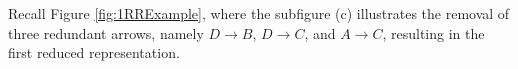 
\vspace{-2mm}
\begin{example}  Recall Figure \ref{fig:1RRExample}, where the subfigure (c) illustrates the removal of three redundant arrows, namely $D \to B$, $D \to C$, and $A \to C$, resulting in the first reduced representation.

\label{exp:1RRExample} \end{example}






